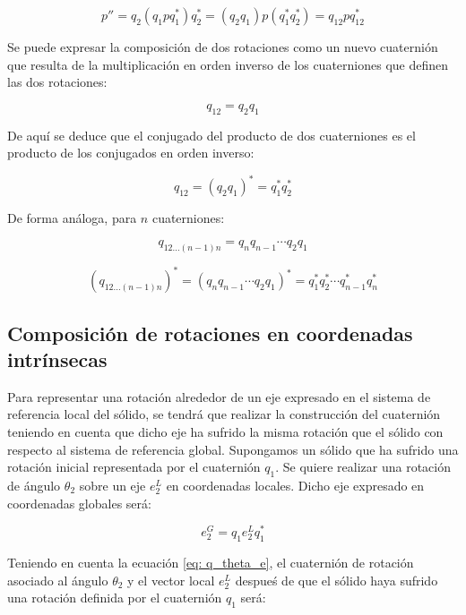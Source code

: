 \documentclass[12pt, a4paper]{report}
\begin{document}
\begin{equation}
p'' = q_2(q_1pq_1^*)q_2^* = (q_2q_1)p(q_1^*q_2^*) = q_{12}pq_{12}^*
\end{equation}

Se puede expresar la composición de dos rotaciones como un nuevo cuaternión que resulta de la multiplicación en orden inverso de los cuaterniones que definen las dos rotaciones:

\begin{equation}
q_{12} = q_2 q_1
\end{equation}

De aquí se deduce que el conjugado del producto de dos cuaterniones es el producto de los conjugados en orden inverso:

\begin{equation}
q_{12} = \left(q_2q_1\right)^* = q_1^*q_2^*
\end{equation}

De forma análoga, para $n$ cuaterniones:

\begin{equation}
q_{12 \dotsc (n-1)n} = q_nq_{n-1} \dotsm q_2q_1
\end{equation}

\begin{equation}
\left( q_{12 \dotsc (n-1)n} \right)^* = \left( q_nq_{n-1} \dotsm q_2q_1 \right)^* = q_1^*q_2^* \dotsm q_{n-1}^*q_n^*
\end{equation}

\subsection{Composición de rotaciones en coordenadas intrínsecas}

Para representar una rotación alrededor de un eje expresado en el sistema de referencia local del sólido, se tendrá que realizar la construcción del cuaternión teniendo en cuenta que dicho eje ha sufrido la misma rotación que el sólido con respecto al sistema de referencia global. Supongamos un sólido que ha sufrido una rotación inicial representada por el cuaternión $q_1$. Se quiere realizar una rotación de ángulo $\theta_2$ sobre un eje $e_2^L$ en coordenadas locales. Dicho eje expresado en coordenadas globales será:

$$ e_2^G = q_1e_2^Lq_1^* $$

Teniendo en cuenta la ecuación \eqref{eq: q_theta_e}, el cuaternión de rotación asociado al ángulo $\theta_2$ y el vector local $e_2^L$ despueś de que el sólido haya sufrido una rotación definida por el cuaternión $q_1$ será:
\end{document}
